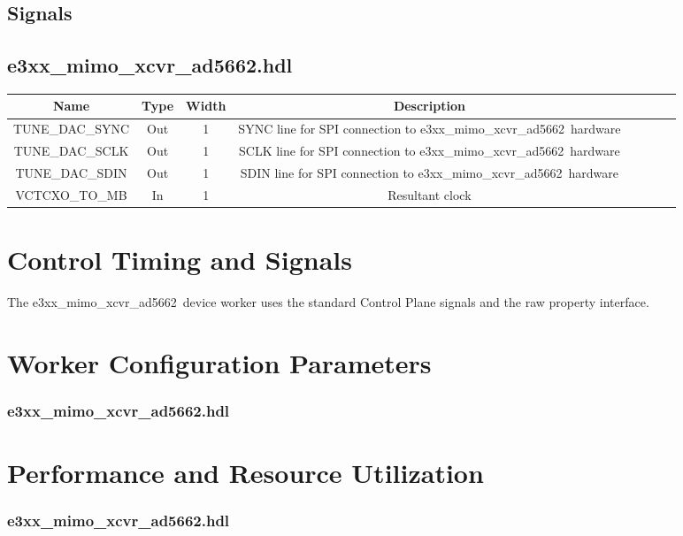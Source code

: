 \documentclass{article}
\def\comp{e3xx\_mimo\_xcvr\_ad5662}
\def\comp{e3xx\_mimo\_xcvr\_ad5662}
\edef\ecomp{e3xx_mimo_xcvr_ad5662}
\begin{document}
\begin{landscape}
\section*{Signals}
	\subsection*{\comp.hdl}
	\begin{scriptsize}
			\begin{tabular}{|c|c|c|c|p{2.6cm}|c|c|c|}
			\hline
			\rowcolor{blue}
			Name & Type  & Width & Description \\
			\hline
			TUNE\_DAC\_SYNC  & Out & 1     & SYNC line for SPI connection to \comp\ hardware    \\
			\hline
			TUNE\_DAC\_SCLK  & Out & 1     & SCLK line for SPI connection to \comp\ hardware    \\
			\hline
			TUNE\_DAC\_SDIN  & Out & 1     & SDIN line for SPI connection to \comp\ hardware    \\
			\hline
			VCTCXO\_TO\_MB  & In & 1     & Resultant clock    \\
			\hline
		\end{tabular}
	\end{scriptsize}
\end{landscape}

\section*{Control Timing and Signals}
The \comp\ device worker uses the standard Control Plane signals and the raw property interface.

\begin{landscape}
\section*{Worker Configuration Parameters}
\subsubsection*{\comp.hdl}

\section*{Performance and Resource Utilization}
\subsubsection*{\comp.hdl}

\end{landscape}
\end{document}
